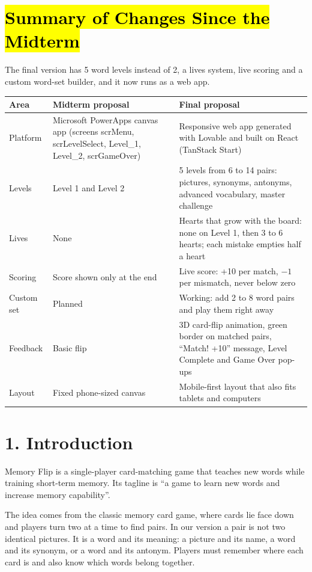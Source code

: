 \documentclass[11pt,a4paper]{article}
\begin{document}
\section*{\hl{Summary of Changes Since the Midterm}}
The final version has 5 word levels instead of 2, a lives system, live scoring and a custom word-set builder, and it now runs as a web app.

\begin{tabularx}{\textwidth}{|p{2.6cm}|L|L|}
\hline
{}\textbf{Area} & \textbf{Midterm proposal} & \textbf{Final proposal} \\ \hline
Platform & Microsoft PowerApps canvas app (screens scrMenu, scrLevelSelect, Level\_1, Level\_2, scrGameOver) & Responsive web app generated with Lovable and built on React (TanStack Start) \\ \hline
Levels & Level 1 and Level 2 & 5 levels from 6 to 14 pairs: pictures, synonyms, antonyms, advanced vocabulary, master challenge \\ \hline
Lives & None & Hearts that grow with the board: none on Level 1, then 3 to 6 hearts; each mistake empties half a heart \\ \hline
Scoring & Score shown only at the end & Live score: +10 per match, $-1$ per mismatch, never below zero \\ \hline
Custom set & Planned & Working: add 2 to 8 word pairs and play them right away \\ \hline
Feedback & Basic flip & 3D card-flip animation, green border on matched pairs, ``Match! +10'' message, Level Complete and Game Over pop-ups \\ \hline
Layout & Fixed phone-sized canvas & Mobile-first layout that also fits tablets and computers \\ \hline
\end{tabularx}

\section{1. Introduction}
Memory Flip is a single-player card-matching game that teaches new words while training short-term memory. Its tagline is ``a game to learn new words and increase memory capability''.

The idea comes from the classic memory card game, where cards lie face down and players turn two at a time to find pairs. In our version a pair is not two identical pictures. It is a word and its meaning: a picture and its name, a word and its synonym, or a word and its antonym. Players must remember where each card is and also know which words belong together.
\end{document}

